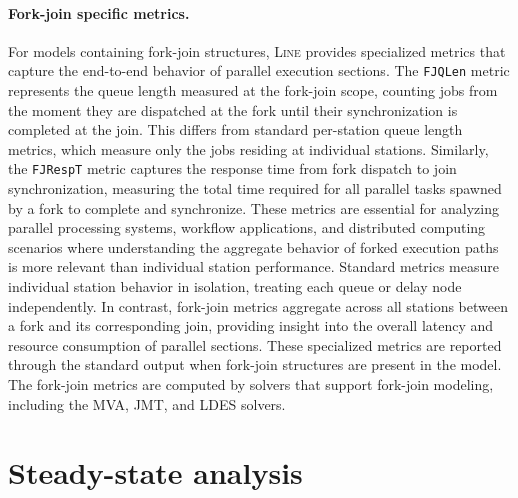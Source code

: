 \paragraph{Fork-join specific metrics.}
For models containing fork-join structures, \textsc{Line} provides specialized metrics that capture the end-to-end behavior of parallel execution sections. The \texttt{FJQLen} metric represents the queue length measured at the fork-join scope, counting jobs from the moment they are dispatched at the fork until their synchronization is completed at the join. This differs from standard per-station queue length metrics, which measure only the jobs residing at individual stations. Similarly, the \texttt{FJRespT} metric captures the response time from fork dispatch to join synchronization, measuring the total time required for all parallel tasks spawned by a fork to complete and synchronize. These metrics are essential for analyzing parallel processing systems, workflow applications, and distributed computing scenarios where understanding the aggregate behavior of forked execution paths is more relevant than individual station performance. Standard metrics measure individual station behavior in isolation, treating each queue or delay node independently. In contrast, fork-join metrics aggregate across all stations between a fork and its corresponding join, providing insight into the overall latency and resource consumption of parallel sections. These specialized metrics are reported through the standard  output when fork-join structures are present in the model. The fork-join metrics are computed by solvers that support fork-join modeling, including the MVA, JMT, and LDES solvers.

\section{Steady-state analysis}

